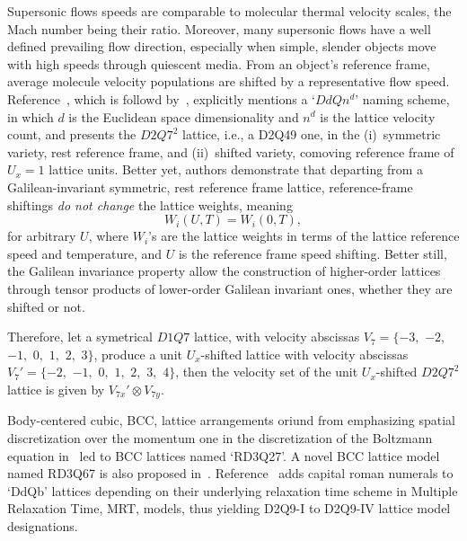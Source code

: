     Supersonic flows speeds are comparable to molecular thermal velocity scales, the Mach number being  their  ratio.  Moreover,
    many supersonic flows have a well defined prevailing flow direction, especially when simple, slender objects move with  high
    speeds through quiescent media. From an object's reference frame, average molecule velocity populations  are  shifted  by  a
    representative     flow     speed.     Reference~\cite{2016-FrapolliN+KarlinIV-PhysRevLett},      which      is      followd
    by~\cite{2020-FrapolliN+KarlinIV-Entropy}, explicitly mentions a `$DdQn^d$' naming scheme, in which  $d$  is  the  Euclidean
    space dimensionality and $n^d$ is the lattice velocity count, and presents the $D2Q7^2$ lattice, i.e., a D2Q49 one,  in  the
    (i)~symmetric variety, rest reference frame, and (ii)~shifted variety, comoving reference frame of $U_x = 1$ lattice  units.
    Better yet, authors  demonstrate  that  departing  from  a  Galilean-invariant  symmetric,  rest  reference  frame  lattice,
    reference-frame shiftings \emph{do not change} the lattice weights, meaning
    \begin{equation}
        W_i(U, T) = W_i(0, T),
    \end{equation}
    \noindent for arbitrary $U$, where $W_i$'s are the lattice weights in terms of the lattice reference speed and  temperature,
    and $U$ is the reference frame speed shifting. Better still, the Galilean invariance  property  allow  the  construction  of
    higher-order lattices through tensor products of lower-order Galilean invariant ones, whether they are shifted or not.

    Therefore, let a symetrical $D1Q7$ lattice, with velocity abscissas $V_7 = \{-3,$ $-2,$ $-1,$ $0,$ $1,$ $2,$ $3\}$,  produce
    a unit $U_x$-shifted lattice with velocity abscissas $V_7' = \{-2,$ $-1,$ $0,$ $1,$ $2,$ $3,$ $4\}$, then the  velocity  set
    of the unit $U_x$-shifted $D2Q7^2$ lattice is given by $V_{7x}' \otimes V_{7y}$.

    Body-centered cubic, BCC, lattice arrangements oriund from emphasizing spatial discretization over the momentum one  in  the
    discretization of the Boltzmann equation in~\cite{2016-NamburiM+AnsumaliS-SciRep} led to  BCC  lattices  named  `RD3Q27'.  A
    novel    BCC    lattice    model    named    RD3Q67    is     also     proposed     in~\cite{2018-AtifM+AnsumaliS-PhysRevE}.
    Reference~\cite{2017-LiL+KlausnerJF-IntJHeatMassTran} adds capital roman numerals to  `DdQb'  lattices  depending  on  their
    underlying relaxation time scheme in Multiple Relaxation Time, MRT, models, thus yielding D2Q9-I to  D2Q9-IV  lattice  model
    designations.

